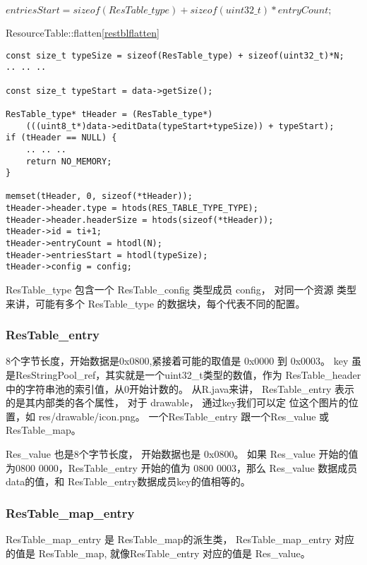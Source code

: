 \documentclass[a4paper,11pt]{article}
\begin{document}
$entriesStart = sizeof(ResTable\_type) + sizeof(uint32\_t) * entryCount;$

ResourceTable::flatten\cref{restblflatten}
\begin{lstlisting}
const size_t typeSize = sizeof(ResTable_type) + sizeof(uint32_t)*N;
.. .. ..

const size_t typeStart = data->getSize();

ResTable_type* tHeader = (ResTable_type*)
    (((uint8_t*)data->editData(typeStart+typeSize)) + typeStart);
if (tHeader == NULL) {
    .. .. ..
    return NO_MEMORY;
}

memset(tHeader, 0, sizeof(*tHeader));
tHeader->header.type = htods(RES_TABLE_TYPE_TYPE);
tHeader->header.headerSize = htods(sizeof(*tHeader));
tHeader->id = ti+1;
tHeader->entryCount = htodl(N);
tHeader->entriesStart = htodl(typeSize);
tHeader->config = config;
\end{lstlisting}

ResTable_type 包含一个 ResTable_config 类型成员 config， 对同一个资源
类型来讲，可能有多个 ResTable_type 的数据块，每个代表不同的配置。

\subsubsection{ ResTable_entry}
8个字节长度，开始数据是0x0800,紧接着可能的取值是 0x0000 到 0x0003。
key 虽是ResStringPool_ref，其实就是一个uint32_t类型的数值，作为
ResTable_header 中的字符串池的索引值，从0开始计数的。 从R.java来讲，
ResTable_entry 表示的是其内部类的各个属性， 对于 drawable， 通过key我们可以定
位这个图片的位置，如 res/drawable/icon.png。
一个ResTable_entry 跟一个Res_value 或 ResTable_map。

Res_value 
也是8个字节长度， 开始数据也是 0x0800。
如果 Res_value 开始的值为0800 0000，ResTable_entry 开始的值为 0800 0003，那么
Res_value 数据成员data的值，和 ResTable_entry数据成员key的值相等的。

\subsubsection{ResTable_map_entry}
ResTable_map_entry 是 ResTable_map的派生类，
ResTable_map_entry 对应的值是 ResTable_map, 就像ResTable_entry 对应的值是
Res_value。
\end{document}
